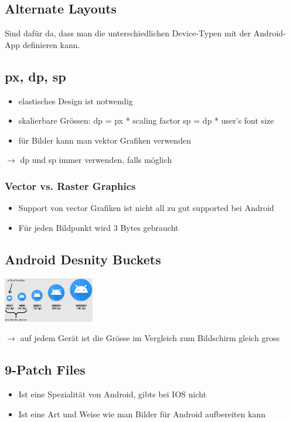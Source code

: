 \documentclass{report}
\newenvironment{Figure}
	{\par\medskip\noindent\minipage{\linewidth}}
	{\endminipage\par\medskip}
\theoremstyle{definition}
\theoremstyle{example}
\begin{document}
\subsection{Alternate Layouts}
Sind dafür da, dass man die unterschiedlichen Device-Typen mit der Android-App definieren kann. 

\subsection{px, dp, sp}
\begin{itemize}
   \item elastisches Design ist notwendig
   \item skalierbare Grössen:
   \subitem dp = px * scaling factor
   \subitem sp = dp * user's font size 
   \item für Bilder kann man vektor Grafiken verwenden
\end{itemize}
$\rightarrow$ dp und sp immer verwenden, falls möglich

\subsubsection{Vector vs. Raster Graphics}
\begin{itemize}
   \item Support von vector Grafiken ist nicht all zu gut supported bei Android
   \item Für jeden Bildpunkt wird 3 Bytes gebraucht
\end{itemize}

\subsection{Android Desnity Buckets}
\begin{Figure}
   \centering
    \includegraphics[width=150px]{img/DensityBuckets.png}
        \label{fig:Android Density Buckets}
\end{Figure}
$\rightarrow$ auf jedem Gerät ist die Grösse im Vergleich zum Bildschirm gleich gross

\subsection{9-Patch Files}
\begin{itemize}
   \item Ist eine Spezialität von Android, gibts bei IOS nicht
   \item Ist eine Art und Weise wie man Bilder für Android aufbereiten kann
\end{itemize}
\end{document}
